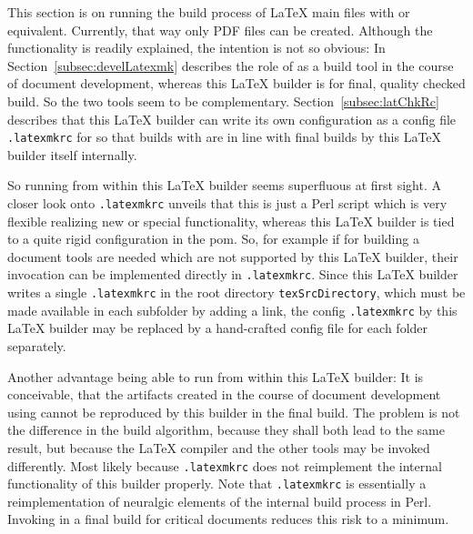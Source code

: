 This section is on running the build process of \LaTeX{} main files 
with  or equivalent. 
Currently, that way only PDF files can be created. 
Although the functionality is readily explained, 
the intention is not so obvious: 
In Section~\ref{subsec:develLatexmk} 
describes the role of  as a build tool 
in the course of document development, 
whereas this \LaTeX{} builder is for final, quality checked build. 
So the two tools seem to be complementary. 
Section~\ref{subsec:latChkRc} describes that this \LaTeX{} builder 
can write its own configuration as 
a config file \texttt{.latexmkrc} for  
so that builds with  are in line 
with final builds by this \LaTeX{} builder itself internally. 

So running  from within this \LaTeX{} builder 
seems superfluous at first sight. 
A closer look onto \texttt{.latexmkrc} unveils that this is just a Perl script 
which is very flexible realizing new or special functionality, 
whereas this \LaTeX{} builder is tied to a quite rigid configuration in the pom. 
So, for example if for building a document tools are needed 
which are not supported by this \LaTeX{} builder, 
their invocation can be implemented directly in \texttt{.latexmkrc}. 
Since this \LaTeX{} builder writes a single \texttt{.latexmkrc} 
in the root directory \texttt{texSrcDirectory}, 
which must be made available in each subfolder by adding a link, 
the config \texttt{.latexmkrc} by this \LaTeX{} builder 
may be replaced by a hand-crafted config file for each folder separately. 

Another advantage being able to run  from within this \LaTeX{} builder: 
It is conceivable, that the artifacts created in the course of document development 
using  cannot be reproduced by this builder in the final build. 
The problem is not the difference in the build algorithm, 
because they shall both lead to the same result, 
but because the \LaTeX{} compiler and the other tools may be invoked differently. 
Most likely because \texttt{.latexmkrc} 
does not reimplement the internal functionality of this builder properly. 
Note that \texttt{.latexmkrc} is essentially a reimplementation of neuralgic elements 
of the internal build process in Perl. 
Invoking  in a final build for critical documents reduces this risk to a minimum. 

